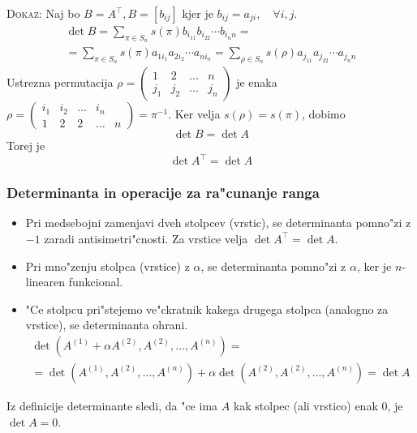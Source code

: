 \textsc{Dokaz:} Naj bo $B = A^\intercal, B = [b_{ij}]$ kjer je $b_{ij} = a_{ji}, \quad \forall i, j$.
\begin{gather*}
\det B = \sum_{\pi \in S_n} s(\pi) b_{i_11} b_{i_22} \cdots b_{i_nn} = \\
= \sum_{\pi \in S_n} s(\pi) a_{1i_1} a_{2i_2} \cdots a_{ni_n} = \sum _{\rho \in S_n} s(\rho) a_{j_11} a_{j_22} \cdots a_{j_nn}
\end{gather*}
Ustrezna permutacija $\rho = \begin{pmatrix}
1 & 2 & \ldots &n \\
j_1 & j_2 & \ldots &j_n
\end{pmatrix}$ je enaka $\rho = \begin{pmatrix}
i_1 & i_2 & \ldots & i_n \\
1 & 2 & 2 & \ldots & n
\end{pmatrix} = \pi^{-1}$. Ker velja $s(\rho) = s(\pi)$, dobimo
\begin{equation*}
\det B = \det A
\end{equation*}
Torej je
\begin{equation*}
\det A^\intercal = \det A
\end{equation*}
%
\subsubsection*{Determinanta in operacije za ra"cunanje ranga}
\begin{itemize}
	\item Pri medsebojni zamenjavi dveh stolpcev (vrstic), se determinanta pomno"zi z  $-1$ zaradi antisimetri"cnosti. Za vrstice velja $\det A^\intercal = \det A$.

	\item Pri mno"zenju stolpca (vrstice) z $\alpha$, se determinanta pomno"zi z $\alpha$, ker je $n$-linearen funkcional.
	
	\item "Ce stolpcu pri"stejemo ve"ckratnik kakega drugega stolpca (analogno za vrstice), se determinanta ohrani.
	\begin{gather*}
		\det(A^{(1)} + \alpha A^{(2)}, A^{(2)}, \ldots, A^{(n)}) = \\
		= \det(A^{(1)}, A^{(2)}, \ldots, A^{(n)}) + \alpha \det(A^{(2)}, A^{(2)}, \ldots, A^{(n)}) = \det A
	\end{gather*}
\end{itemize}
Iz definicije determinante sledi, da "ce ima $A$ kak stolpec (ali vrstico) enak 0, je $\det A = 0$.

